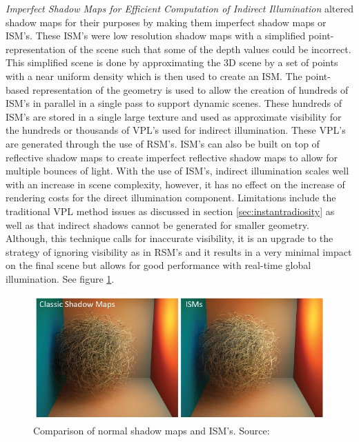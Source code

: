 \textit{Imperfect Shadow Maps for Efficient Computation of Indirect Illumination} \cite{Ritschel2008} altered shadow maps for their purposes by making them imperfect shadow maps or ISM's.  These ISM's were low resolution shadow maps with a simplified point-representation of the scene such that some of the depth values could be incorrect.  This simplified scene is done by approximating the 3D scene by a set of points with a near uniform density which is then used to create an ISM.  The point-based representation of the geometry is used to allow the creation of hundreds of ISM's in parallel in a single pass to support dynamic scenes.  These hundreds of ISM's are stored in a single large texture and used as approximate visibility for the hundreds or thousands of VPL's used for indirect illumination.  These VPL's are generated through the use of RSM's.  ISM's can also be built on top of reflective shadow maps to create imperfect reflective shadow maps to allow for multiple bounces of light.  With the use of ISM's, indirect illumination scales well with an increase in scene complexity, however, it has no effect on the increase of rendering costs for the direct illumination component.  Limitations include the traditional VPL method issues as discussed in section \ref{sec:instantradiosity} as well as that indirect shadows cannot be generated for smaller geometry.  Although, this technique calls for inaccurate visibility, it is an upgrade to the strategy of ignoring visibility as in RSM's and it results in a very minimal impact on the final scene but allows for good performance with real-time global illumination.  See figure \ref{fig:ISMcompare}.

\begin{figure}[h!]
  \centering
    \includegraphics[width=1.0\textwidth]{ISMcompare.jpg}
  \caption{Comparison of normal shadow maps and ISM's. Source: \protect\cite{Ritschel2008}}
	\label{fig:ISMcompare}
\end{figure}

